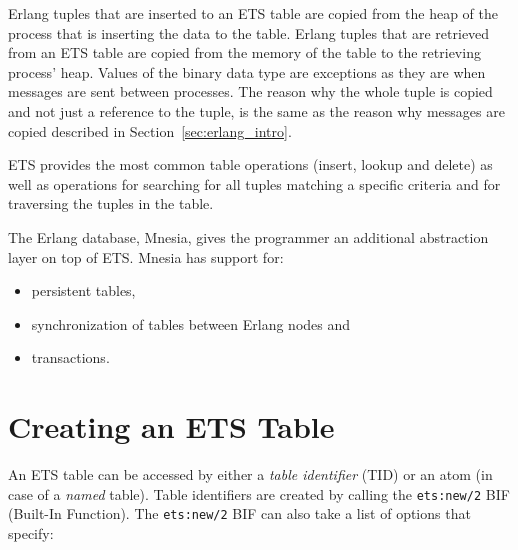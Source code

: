 \documentclass[aps,pre,preprint,nofootinbib]{revtex4}
\begin{document}
Erlang tuples that are inserted to an ETS table are copied from the heap of the process that is inserting the data to the table.
Erlang tuples that are retrieved from an ETS table are copied from the memory of the table to the retrieving process' heap.
Values of the binary data type are exceptions as they are when messages are sent between processes.
The reason why the whole tuple is copied and not just a reference to the tuple, is the same as the reason why messages are copied described in Section~\ref{sec:erlang_intro}.

ETS provides the most common table operations (insert, lookup and delete) as well as operations for searching for all tuples matching a specific criteria and for traversing the tuples in the table.

The Erlang database, Mnesia, gives the programmer an additional abstraction layer on top of ETS. 
Mnesia has support for:
\begin{itemize}
 \item persistent tables,
 \item synchronization of tables between Erlang nodes and
 \item transactions.
\end{itemize}

\section{Creating an ETS Table}

An ETS table can be accessed by either a \emph{table identifier} (TID) or an atom (in case of a \emph{named} table).
Table identifiers are created by calling the \verb|ets:new/2| BIF (Built-In Function).
The \verb|ets:new/2| BIF can also take a list of options that specify:
\end{document}
